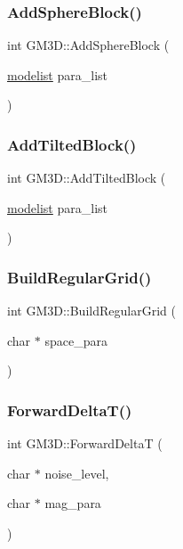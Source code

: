 \mbox{\label{class_g_m3_d_ae1c8d36d2273f73d9744b5d358881691}} 
\subsubsection{\texorpdfstring{AddSphereBlock()}{AddSphereBlock()}}
{\footnotesize\ttfamily int G\+M3\+D\+::\+Add\+Sphere\+Block (\begin{DoxyParamCaption}\item[{\mbox{\hyperlink{structmodelist}{modelist}}}]{para\+\_\+list }\end{DoxyParamCaption})}

\mbox{\label{class_g_m3_d_ad83b4f92015b2a58a5a20185250bce0d}} 
\subsubsection{\texorpdfstring{AddTiltedBlock()}{AddTiltedBlock()}}
{\footnotesize\ttfamily int G\+M3\+D\+::\+Add\+Tilted\+Block (\begin{DoxyParamCaption}\item[{\mbox{\hyperlink{structmodelist}{modelist}}}]{para\+\_\+list }\end{DoxyParamCaption})}

\mbox{\label{class_g_m3_d_a5e8430d633cf08053ee05395e3ae3d12}} 
\subsubsection{\texorpdfstring{BuildRegularGrid()}{BuildRegularGrid()}}
{\footnotesize\ttfamily int G\+M3\+D\+::\+Build\+Regular\+Grid (\begin{DoxyParamCaption}\item[{char $\ast$}]{space\+\_\+para }\end{DoxyParamCaption})}

\mbox{\label{class_g_m3_d_a15219677d9903abb90f53b7c6963ee4a}} 
\subsubsection{\texorpdfstring{ForwardDeltaT()}{ForwardDeltaT()}}
{\footnotesize\ttfamily int G\+M3\+D\+::\+Forward\+DeltaT (\begin{DoxyParamCaption}\item[{char $\ast$}]{noise\+\_\+level,  }\item[{char $\ast$}]{mag\+\_\+para }\end{DoxyParamCaption})}

